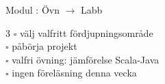 
    Modul : Övn  $\rightarrow$ Labb 
    \begin{multicols}{3}\SlideFontTiny
    $\square$ välj valfritt fördjupningsområde \\
$\square$ påbörja projekt \\
$\square$ valfri övning: jämförelse Scala-Java \\
$\square$ ingen föreläsning denna vecka \\
    \end{multicols}
    
